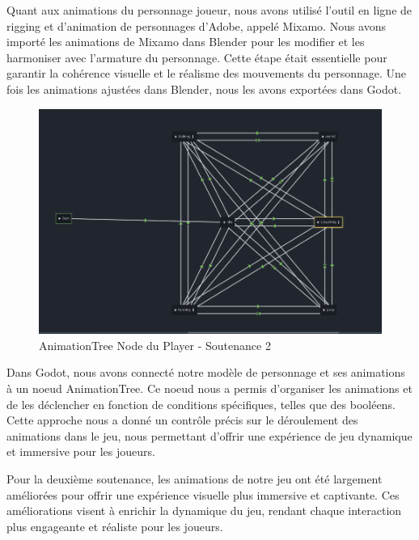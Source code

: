 \documentclass[
	article,			%
	11pt,				%
	oneside,			%
	a4paper,			%
	chapter=TITLE,
	french,			%
	sumario=tradicional
	]{base_nt}
\begin{document}
Quant aux animations du personnage joueur, nous avons utilisé l'outil en ligne de rigging et d'animation de personnages d'Adobe, appelé Mixamo. Nous avons importé les animations de Mixamo dans Blender pour les modifier et les harmoniser avec l'armature du personnage. Cette étape était essentielle pour garantir la cohérence visuelle et le réalisme des mouvements du personnage. Une fois les animations ajustées dans Blender, nous les avons exportées dans Godot.

\begin{figure}[ht]
	\caption{AnimationTree Node du Player - Soutenance 2}
	\centering
	\includegraphics[width=1\linewidth]{paper22.png}
	\legend{}
	
\end{figure}

\newpage

Dans Godot, nous avons connecté notre modèle de personnage et ses animations à un noeud AnimationTree. Ce noeud nous a permis d'organiser les animations et de les déclencher en fonction de conditions spécifiques, telles que des booléens. Cette approche nous a donné un contrôle précis sur le déroulement des animations dans le jeu, nous permettant d'offrir une expérience de jeu dynamique et immersive pour les joueurs.

\newpage

Pour la deuxième soutenance, les animations de notre jeu ont été largement améliorées pour offrir une expérience visuelle plus immersive et captivante. Ces améliorations visent à enrichir la dynamique du jeu, rendant chaque interaction plus engageante et réaliste pour les joueurs.
\end{document}
